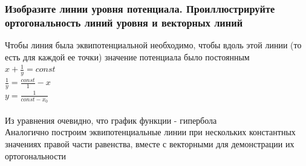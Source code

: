 \documentclass{article}
\begin{document}
                \subsubsection{Изобразите линии уровня потенциала. Проиллюстрируйте ортогональность линий уровня и векторных линий}
                Чтобы линия была эквипотенциальной необходимо, чтобы вдоль этой линии (то есть для каждой ее точки) значение потенциала было постоянным\\
                $x + \frac{1}{y} = const$\\
                $\frac{1}{y} = \frac{const}{1}-x$\\
                $y = \frac{1}{const - x_0}$\\\\
                Из уравнения очевидно, что график функции - гипербола\\
                Аналогично построим эквипотенциальные линии при нескольких константных значениях правой части равенства, вместе с векторными для демонстрации их ортогональности
                \begin{figure}[h!]
                \end{figure}\\
                \begin{figure}[h!]
                \end{figure}
\end{document}
